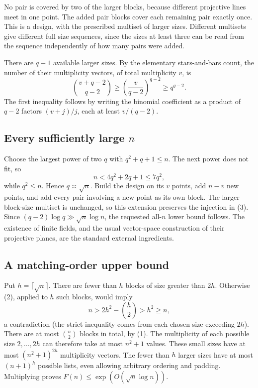 No pair is covered by two of the larger blocks, because different projective lines meet in one point. The added pair blocks cover each remaining pair exactly once. This is a design, with the prescribed multiset of larger sizes. Different multisets give different full size sequences, since the sizes at least three can be read from the sequence independently of how many pairs were added.

There are $q-1$ available larger sizes. By the elementary stars-and-bars count, the number of their multiplicity vectors, of total multiplicity $v$, is
\[
 \binom{v+q-2}{q-2}\geq\left(\frac v{q-2}\right)^{q-2}
 \geq q^{q-2}. \tag{3}
\]
The first inequality follows by writing the binomial coefficient as a product of $q-2$ factors $(v+j)/j$, each at least $v/(q-2)$.

\subsection*{Every sufficiently large $n$}
Choose the largest power of two $q$ with $q^2+q+1\leq n$. The next power does not fit, so
\[
 n<4q^2+2q+1\leq7q^2,
\]
while $q^2\leq n$. Hence $q\asymp\sqrt n$.
Build the design on its $v$ points, add $n-v$ new points, and add every pair involving a new point as its own block. The larger block-size multiset is unchanged, so this extension preserves the injection in (3). Since $(q-2)\log q\gg\sqrt n\log n$, the requested all-$n$ lower bound follows. The existence of finite fields, and the usual vector-space construction of their projective planes, are the standard external ingredients.

\subsection*{A matching-order upper bound}
Put $h=\lceil\sqrt n\rceil$. There are fewer than $h$ blocks of size greater than $2h$. Otherwise (2), applied to $h$ such blocks, would imply
\[
 n>2h^2-\binom h2>h^2\geq n,
\]
a contradiction (the strict inequality comes from each chosen size exceeding $2h$).
There are at most $\binom n2$ blocks in total, by (1). The multiplicity of each possible size $2,\ldots,2h$ can therefore take at most $n^2+1$ values. These small sizes have at most
$(n^2+1)^{2h}$ multiplicity vectors. The fewer than $h$ larger sizes have at most $(n+1)^h$ possible lists, even allowing arbitrary ordering and padding. Multiplying proves $F(n)\leq\exp(O(\sqrt n\log n))$.

